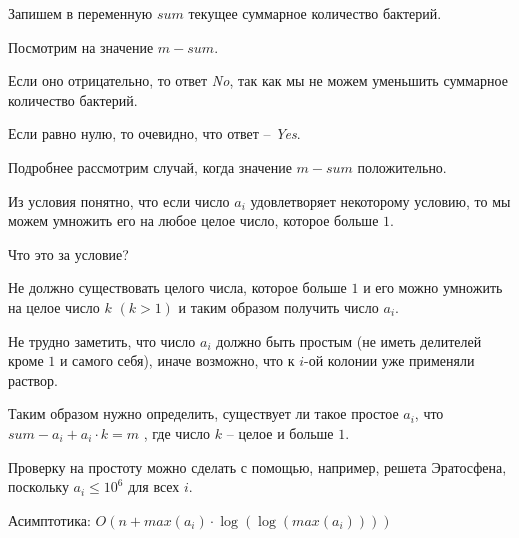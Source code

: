 \solutionSection

Запишем в переменную $sum$ текущее суммарное количество бактерий.

Посмотрим на значение $m - sum$.

Если оно отрицательно, то ответ \textit{No}, так как мы не можем уменьшить
суммарное количество бактерий.

Если равно нулю, то очевидно, что ответ -- \textit{Yes}.

Подробнее рассмотрим случай, когда значение $m - sum$ положительно.

Из условия понятно, что если число $a_i$ удовлетворяет некоторому условию,
то мы можем умножить его на любое целое число, которое больше $1$.

Что это за условие?

Не должно существовать целого числа, которое больше $1$ и его можно умножить на целое число $k$
$(k > 1)$ и таким образом получить число $a_i$.

Не трудно заметить, что число $a_i$ должно быть простым
(не иметь делителей кроме $1$ и самого себя),
иначе возможно, что к $i$-ой колонии уже применяли раствор.

Таким образом нужно определить, существует ли такое простое $a_i$, что
$sum - a_i + a_i \cdot k = m$ , где число $k$ -- целое и больше $1$.

Проверку на простоту можно сделать с помощью, например, решета Эратосфена,
поскольку $a_i \le 10^6$ для всех $i$.

Асимптотика: $O(n + max(a_i) \cdot \log (\log (max(a_i))))$

\codeExample

